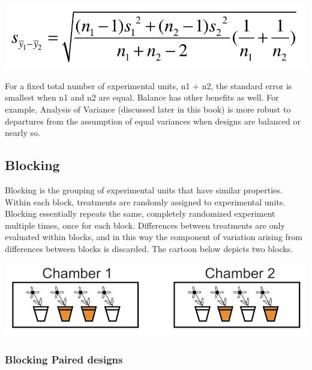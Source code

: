 \documentclass[]{book}
\begin{document}
\includegraphics[width=11.75in]{images/images_6a.007}

For a fixed total number of experimental units, n1 + n2, the standard error is smallest when n1 and n2 are equal. Balance has other benefits as well. For example, Analysis of Variance (discussed later in this book) is more robust to departures from the assumption of equal variances when designs are balanced or nearly so.

\hypertarget{blocking}{%
\subsection{Blocking}\label{blocking}}

Blocking is the grouping of experimental units that have similar properties. Within each block, treatments are randomly assigned to experimental units. Blocking essentially repeats the same, completely randomized experiment multiple times, once for each block. Differences between treatments are only evaluated within blocks, and in this way the component of variation arising from differences between blocks is discarded. The cartoon below depicts two blocks.

\includegraphics[width=12.28in]{images/images_6a.008}

\hypertarget{blocking-paired-designs}{%
\subsubsection{Blocking \textbar{} Paired designs}\label{blocking-paired-designs}}
\end{document}
